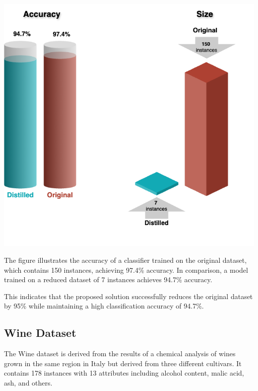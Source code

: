 \begin{minipage}{0.6\textwidth}
    \centering
    \includegraphics[width=\textwidth]{images/iris.png}
\end{minipage}
\hspace{0.02\textwidth} %
\begin{minipage}{0.35\textwidth}
    The figure illustrates the accuracy of a classifier trained on the original dataset, which contains 150 instances, achieving 97.4\% accuracy. In comparison, a model trained on a reduced dataset of 7 instances achieves 94.7\% accuracy. 
    
    This indicates that the proposed solution successfully reduces the original dataset by 95\% while maintaining a high classification accuracy of 94.7\%.
\end{minipage}

\subsection{Wine Dataset}

The Wine dataset is derived from the results of a chemical analysis of wines grown in the same region in Italy but derived from three different cultivars. It contains 178 instances with 13 attributes including alcohol content, malic acid, ash, and others. 

